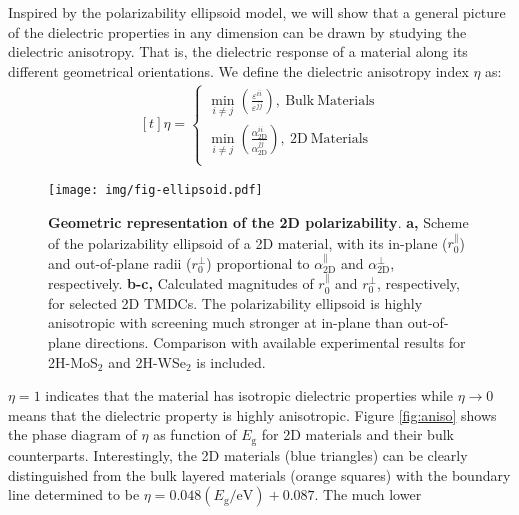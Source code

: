 \documentclass[journal=ancac3,manuscript=article,email=true,hyperref=true,keywords=false]{achemso}
\begin{document}
Inspired by the polarizability ellipsoid model, we will show that a general 
picture of the dielectric properties in
any dimension can be drawn by studying the dielectric
anisotropy. That is, the dielectric response of a material along 
its different geometrical orientations. 
%
%
We define the dielectric anisotropy index $\eta$ as:
\begin{equation}
  \label{eq:anisotropy}
  \begin{aligned}[t]
    \eta =
    \begin{cases}
      {\displaystyle \min_{i \neq j}}
      {\displaystyle
        \left(\frac{\varepsilon^{ii}}{\varepsilon^{jj}}\right)},
      \ \mathrm{Bulk\ Materials}\\
      {\displaystyle \min_{i \neq j}}
      {\displaystyle
        \left(\frac{\alpha_{\mathrm{2D}}^{ii}}{\alpha_{\mathrm{2D}}^{jj}}\right)},
      \ \mathrm{2D\ Materials}\\
    \end{cases}
  \end{aligned}
\end{equation}
%
%
\begin{figure}[H]
  \centering
  \texttt{[image: img/fig-ellipsoid.pdf]}
  \caption{\label{fig-ellip} \textbf{Geometric representation of the
      2D polarizability}. 
      \textbf{a,} Scheme of the polarizability
    ellipsoid of a 2D material, with its in-plane
    ($r_{0}^{\parallel}$) and out-of-plane radii
    ($r_{\mathrm{0}}^{\perp}$) proportional to
    $\alpha_{\mathrm{2D}}^{\parallel}$ and
    $\alpha_{\mathrm{2D}}^{\perp}$, respectively.  
    {\bf b-c,} Calculated magnitudes of 
    $r_{0}^{\parallel}$ and $r_{0}^{\perp}$, respectively, for selected 2D TMDCs. 
    The polarizability ellipsoid is highly anisotropic with screening much
    stronger at in-plane than out-of-plane directions. Comparison with available experimental 
    results\cite{Roch_2018,Verzhbitskiy19} for 2H-MoS$_2$ and 2H-WSe$_2$ is included.} 
\end{figure}
%
%
%
$\eta=1$ indicates that the material has isotropic dielectric properties
while $\eta \to 0$ means that the dielectric property is highly
anisotropic. Figure \ref{fig:aniso} shows the phase diagram of $\eta$
as function of $E_{\mathrm{g}}$ for 2D materials and their bulk
counterparts. Interestingly, the 2D materials (blue triangles) can be
clearly distinguished from the bulk layered materials (orange squares)
with the boundary line determined to be
$\eta =0.048 (E_{\mathrm{g}}/ \mathrm{eV})+0.087$. The much lower
\end{document}
